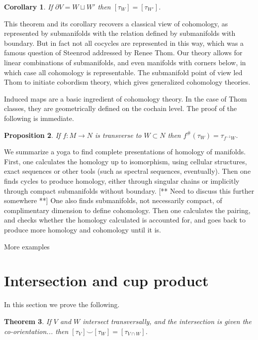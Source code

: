 \documentclass{amsart}          %
\newtheorem{theorem}{Theorem}
\newtheorem{corollary}[theorem]{Corollary}
\newtheorem{proposition}[theorem]{Proposition}
\begin{document}
\begin{corollary}
If $\partial V = W \sqcup W'$ then $[\tau_W] = [\tau_{W'}]$.
\end{corollary}

This theorem and its
corollary recovers a classical view of cohomology, as represented by 
submanifolds with the relation defined by submanifolds with boundary.  But in fact
not all cocycles are represented in this way, which was a famous question of Steenrod addressed by Renee Thom.  
Our theory allows for linear combinations
of submanifolds, and even manifolds with corners below, in which case all cohomology is representable.  
The submanifold point of view led Thom
to initiate cobordism theory, which gives generalized cohomology theories.



Induced maps are a basic ingredient of cohomology theory.  
In the case of Thom classes, they are geometrically defined on the cochain level.  The
proof of the following is immediate.

\begin{proposition}\label{pullback}
If $f : M \to N$ is transverse to $W \subset N$ then $f^{\#}(\tau_{W}) = \tau_{f^{-1} W}$.
\end{proposition}

We summarize a yoga to find complete presentations of homology of manifolds.
First, one calculates the homology up to isomorphism, using cellular structures, exact sequences or other tools
(such as spectral sequences, eventually).  Then one finds  cycles to produce homology, either through singular chains
or implicitly through compact submanifolds without boundary.  [** Need to discuss this further somewhere **]   One
also finds submanifolds, not necessarily compact, of complimentary dimension to define cohomology.  Then one
calculates the pairing, and checks whether the homology calculated is accounted for, and goes back to produce more homology
and cohomology until it is.


More examples



\section{Intersection and cup product}

In this section we prove the following.

\begin{theorem}
If $V$ and $W$ intersect transversally, and the intersection is given the co-orientation... then $[\tau_{V}] \smile [\tau_W] = [\tau_{V \cap W}]$.
\end{theorem}
\end{document}
